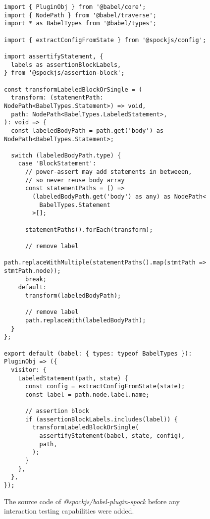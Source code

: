\begin{figure}
  \begin{verbatim}
import { PluginObj } from '@babel/core';
import { NodePath } from '@babel/traverse';
import * as BabelTypes from '@babel/types';

import { extractConfigFromState } from '@spockjs/config';

import assertifyStatement, {
  labels as assertionBlockLabels,
} from '@spockjs/assertion-block';

const transformLabeledBlockOrSingle = (
  transform: (statementPath: NodePath<BabelTypes.Statement>) => void,
  path: NodePath<BabelTypes.LabeledStatement>,
): void => {
  const labeledBodyPath = path.get('body') as NodePath<BabelTypes.Statement>;

  switch (labeledBodyPath.type) {
    case 'BlockStatement':
      // power-assert may add statements in betweeen,
      // so never reuse body array
      const statementPaths = () =>
        (labeledBodyPath.get('body') as any) as NodePath<
          BabelTypes.Statement
        >[];

      statementPaths().forEach(transform);

      // remove label
      path.replaceWithMultiple(statementPaths().map(stmtPath => stmtPath.node));
      break;
    default:
      transform(labeledBodyPath);

      // remove label
      path.replaceWith(labeledBodyPath);
  }
};

export default (babel: { types: typeof BabelTypes }): PluginObj => ({
  visitor: {
    LabeledStatement(path, state) {
      const config = extractConfigFromState(state);
      const label = path.node.label.name;

      // assertion block
      if (assertionBlockLabels.includes(label)) {
        transformLabeledBlockOrSingle(
          assertifyStatement(babel, state, config),
          path,
        );
      }
    },
  },
});
  \end{verbatim}
  \caption{
    The source code of \textit{@spockjs/babel-plugin-spock}
    before any interaction testing capabilities were added.
  }\label{fig:BabelPluginSpockBefore}
\end{figure}
